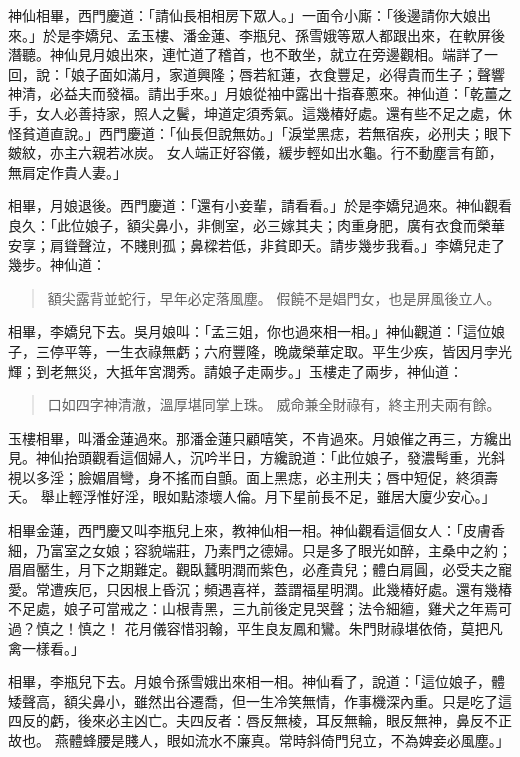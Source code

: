 神仙相畢，西門慶道：「請仙長相相房下眾人。」一面令小廝：「後邊請你大娘出來。」於是李嬌兒、孟玉樓、潘金蓮、李瓶兒、孫雪娥等眾人都跟出來，在軟屏後潛聽。神仙見月娘出來，連忙道了稽首，也不敢坐，就立在旁邊觀相。端詳了一回，說：「娘子面如滿月，家道興隆；唇若紅蓮，衣食豐足，必得貴而生子；聲響神清，必益夫而發福。請出手來。」月娘從袖中露出十指春蔥來。神仙道：「乾薑之手，女人必善持家，照人之鬢，坤道定須秀氣。這幾椿好處。還有些不足之處，休怪貧道直說。」西門慶道：「仙長但說無妨。」「淚堂黑痣，若無宿疾，必刑夫；眼下皴紋，亦主六親若冰炭。
女人端正好容儀，緩步輕如出水龜。行不動塵言有節，無肩定作貴人妻。」

相畢，月娘退後。西門慶道：「還有小妾輩，請看看。」於是李嬌兒過來。神仙觀看良久：「此位娘子，額尖鼻小，非側室，必三嫁其夫；肉重身肥，廣有衣食而榮華安享；肩聳聲泣，不賤則孤；鼻樑若低，非貧即夭。請步幾步我看。」李嬌兒走了幾步。神仙道：
\begin{quote}
額尖露背並蛇行，早年必定落風塵。
假饒不是娼門女，也是屏風後立人。
\end{quote}

相畢，李嬌兒下去。吳月娘叫：「孟三姐，你也過來相一相。」神仙觀道：「這位娘子，三停平等，一生衣祿無虧；六府豐隆，晚歲榮華定取。平生少疾，皆因月孛光輝；到老無災，大抵年宮潤秀。請娘子走兩步。」玉樓走了兩步，神仙道：
\begin{quote}
口如四字神清澈，溫厚堪同掌上珠。
威命兼全財祿有，終主刑夫兩有餘。
\end{quote}

玉樓相畢，叫潘金蓮過來。那潘金蓮只顧嘻笑，不肯過來。月娘催之再三，方纔出見。神仙抬頭觀看這個婦人，沉吟半日，方纔說道：「此位娘子，發濃髩重，光斜視以多淫；臉媚眉彎，身不搖而自顫。面上黑痣，必主刑夫；唇中短促，終須壽夭。
舉止輕浮惟好淫，眼如點漆壞人倫。月下星前長不足，雖居大廈少安心。」

相畢金蓮，西門慶又叫李瓶兒上來，教神仙相一相。神仙觀看這個女人：「皮膚香細，乃富室之女娘；容貌端莊，乃素門之德婦。只是多了眼光如醉，主桑中之約；眉眉靨生，月下之期難定。觀臥蠶明潤而紫色，必產貴兒；體白肩圓，必受夫之寵愛。常遭疾厄，只因根上昏沉；頻遇喜祥，蓋謂福星明潤。此幾椿好處。還有幾椿不足處，娘子可當戒之：山根青黑，三九前後定見哭聲；法令細繵，雞犬之年焉可過？慎之！慎之！
花月儀容惜羽翰，平生良友鳳和鸞。朱門財祿堪依倚，莫把凡禽一樣看。」

相畢，李瓶兒下去。月娘令孫雪娥出來相一相。神仙看了，說道：「這位娘子，體矮聲高，額尖鼻小，雖然出谷遷喬，但一生冷笑無情，作事機深內重。只是吃了這四反的虧，後來必主凶亡。夫四反者：唇反無棱，耳反無輪，眼反無神，鼻反不正故也。
燕體蜂腰是賤人，眼如流水不廉真。常時斜倚門兒立，不為婢妾必風塵。」

